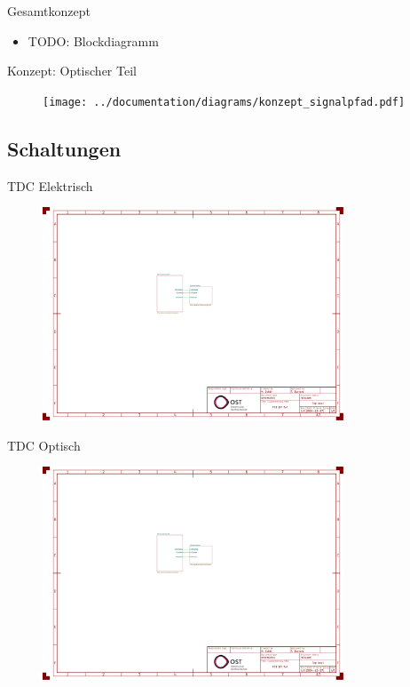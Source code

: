 \begin{frame}{Gesamtkonzept}
    \begin{itemize}
        \item TODO: Blockdiagramm
    \end{itemize}
\end{frame}

\begin{frame}{Konzept: Optischer Teil}
    \begin{figure}
        \texttt{[image: ../documentation/diagrams/konzept\_signalpfad.pdf]}
    \end{figure}
\end{frame}

\subsection{Schaltungen}

\begin{frame}{TDC Elektrisch}
    \begin{figure}
        \includegraphics[page=2, trim=80 330 750 310, clip, width=0.8\textwidth]{../documentation/attachments/schematic.pdf}
    \end{figure}
\end{frame}

\begin{frame}{TDC Optisch}
    \begin{figure}
        \includegraphics[page=2, trim=530 330 300 310, clip, width=0.8\textwidth]{../documentation/attachments/schematic.pdf}
    \end{figure}
\end{frame}

